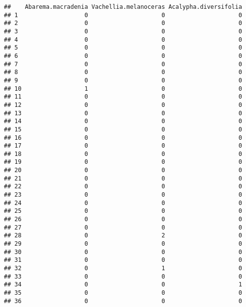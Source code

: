 \documentclass[
]{article}
\begin{document}
\begin{verbatim}
##    Abarema.macradenia Vachellia.melanoceras Acalypha.diversifolia
## 1                   0                     0                     0
## 2                   0                     0                     0
## 3                   0                     0                     0
## 4                   0                     0                     0
## 5                   0                     0                     0
## 6                   0                     0                     0
## 7                   0                     0                     0
## 8                   0                     0                     0
## 9                   0                     0                     0
## 10                  1                     0                     0
## 11                  0                     0                     0
## 12                  0                     0                     0
## 13                  0                     0                     0
## 14                  0                     0                     0
## 15                  0                     0                     0
## 16                  0                     0                     0
## 17                  0                     0                     0
## 18                  0                     0                     0
## 19                  0                     0                     0
## 20                  0                     0                     0
## 21                  0                     0                     0
## 22                  0                     0                     0
## 23                  0                     0                     0
## 24                  0                     0                     0
## 25                  0                     0                     0
## 26                  0                     0                     0
## 27                  0                     0                     0
## 28                  0                     2                     0
## 29                  0                     0                     0
## 30                  0                     0                     0
## 31                  0                     0                     0
## 32                  0                     1                     0
## 33                  0                     0                     0
## 34                  0                     0                     1
## 35                  0                     0                     0
## 36                  0                     0                     0

\end{verbatim}
\end{document}
